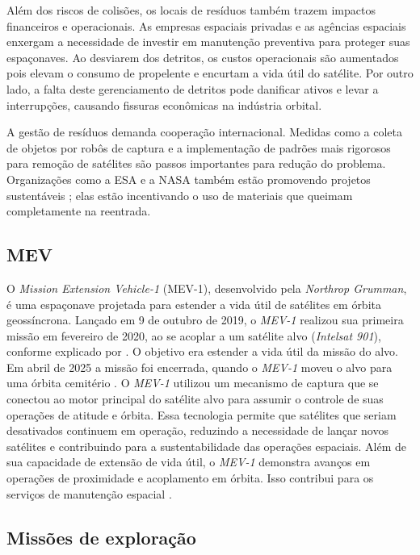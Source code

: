 Além dos riscos de colisões, os locais de resíduos também trazem impactos financeiros e operacionais. As empresas espaciais privadas e as agências espaciais enxergam a necessidade de investir em manutenção preventiva para proteger suas espaçonaves.
Ao desviarem dos detritos, os custos operacionais são aumentados pois elevam o consumo de propelente e encurtam a vida útil do satélite.
Por outro lado, a falta deste gerenciamento de detritos pode danificar ativos e levar a interrupções, causando fissuras econômicas na indústria orbital.

A gestão de resíduos demanda cooperação internacional.
Medidas como a coleta de objetos por robôs de captura e a implementação de padrões mais rigorosos para remoção de satélites são passos importantes para redução do problema.
Organizações como a ESA e a NASA também estão promovendo projetos sustentáveis \cite{esaDebrisMitigation2023}; elas estão incentivando o uso de materiais que queimam completamente na reentrada.

\subsection{MEV}

O \emph{Mission Extension Vehicle-1} (MEV-1), desenvolvido pela \emph{Northrop Grumman}, é uma espaçonave projetada para estender a vida útil de satélites em órbita geossíncrona.
Lançado em 9 de outubro de 2019, o \emph{MEV-1} realizou sua primeira missão em fevereiro de 2020, ao se acoplar a um satélite alvo (\emph{Intelsat 901}), conforme explicado por \cite{nytMEV1}. O objetivo era estender a vida útil da missão do  alvo.
Em abril de 2025 a missão foi encerrada, quando o \emph{MEV-1} moveu o alvo para uma órbita cemitério \cite{intelsat901}.
O \emph{MEV-1} utilizou um mecanismo de captura que se conectou ao motor principal do satélite alvo para assumir o controle de suas operações de atitude e órbita.
Essa tecnologia permite que satélites que seriam desativados continuem em operação, reduzindo a necessidade de lançar novos satélites e contribuindo para a sustentabilidade das operações espaciais.
Além de sua capacidade de extensão de vida útil, o \emph{MEV-1} demonstra avanços em operações de proximidade e acoplamento em órbita. Isso contribui para os serviços de manutenção espacial \cite{mev1}.

\subsection{Missões de exploração}

